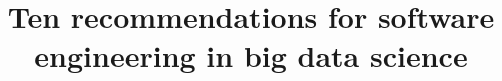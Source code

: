 \documentclass{bmcart}
\begin{document}
\begin{frontmatter}

\begin{fmbox}


\title{Ten recommendations for software engineering in big data science}


\author[
   addressref={aff1},                   %
   corref={aff1},                       %
   email={hastings@ebi.ac.uk}   %
]{ }
\author[
   addressref={aff1},
   email={kenneth@ebi.ac.uk}
]{ }
\author[
   addressref={aff1},
   email={steinbeck@ebi.ac.uk}
]{ }


\address[id=aff1]{%
  , %
  ,                     %
  ,                              %
}


\end{fmbox}
\end{frontmatter}
\end{document}
